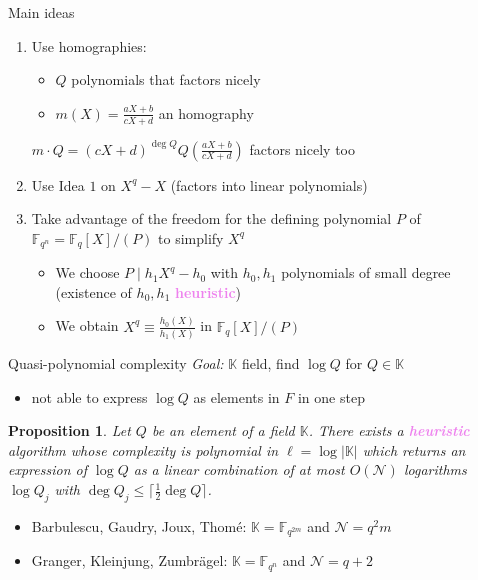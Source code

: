 \documentclass[xcolor=x11names,compress]{beamer}
\theoremstyle{break}
\newtheorem{prop}[thm]{Proposition}
\theoremstyle{sc}
\theoremstyle{definition}
\theoremstyle{remark}
\begin{document}
\begin{frame}{Main ideas}
  \begin{enumerate}
    \item Use homographies:
      \begin{itemize}
        \item $Q$ polynomials that factors nicely
        \item $m(X) = \frac{aX+b}{cX+d}$ an homography
      \end{itemize}
      $m\cdot Q = (cX+d)^{\deg Q}Q(\frac{aX+b}{cX+d})$ factors nicely too
      \newline
    \item Use Idea $1$ on $X^q-X$ (factors into linear polynomials)
      \newline
    \item Take advantage of the freedom for the defining polynomial $P$ of
      $\mathbb{F}_{q^n}=\mathbb{F}_q[X]/(P)$ to simplify $X^q$
      \begin{itemize}
        \item We choose $P\;|\;h_1X^q-h_0$ with $h_0, h_1$ polynomials of small
          degree (existence of $h_0, h_1$
          \textcolor{violet}{\textbf{heuristic}})
        \item We obtain $X^q \equiv \frac{h_0(X)}{h_1(X)}$ in
          $\mathbb{F}_q[X]/(P)$
      \end{itemize}
  \end{enumerate}
\end{frame}

\begin{frame}{Quasi-polynomial complexity}
  \emph{Goal:} $\mathbb{K}$ field, find $\log Q$ for $Q\in \mathbb{K}$ 
  \begin{itemize}
    \item not able to express $\log Q$ as elements in $F$ in one step 
  \end{itemize}
\begin{prop}
  Let $Q$ be an element of a field $\mathbb{K}$. There exists a
  \textcolor{violet}{\textbf{heuristic}} algorithm whose complexity is polynomial in
  $\ell=\log|\mathbb{K}|$ which returns an expression of $\log Q$ as a linear combination of
  at most $O(\mathcal N)$ logarithms $\log Q_j$ with $\deg Q_j\leq \lceil
  \frac{1}{2}\deg Q\rceil$.
\end{prop}
\begin{itemize}
  \item Barbulescu, Gaudry, Joux, Thomé: $\mathbb{K}=\mathbb{F}_{q^{2m}}$ and $\mathcal N=q^2 m$
  \item Granger, Kleinjung, Zumbrägel: $\mathbb{K}=\mathbb{F}_{q^n}$ and $\mathcal N =
    q+2$
\end{itemize}
\end{frame}
\end{document}
